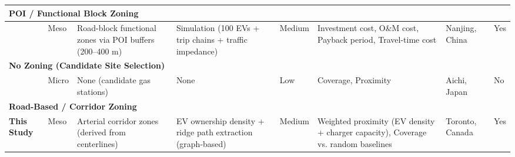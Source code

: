 \begin{table}[htbp]
{\begin{tabular}{p{1.2cm} p{2cm} p{2.4cm} p{2.6cm} >{\centering\arraybackslash}p{1.4cm} p{2.8cm} p{2cm} >{\centering\arraybackslash}p{1.4cm}}
\midrule
\multicolumn{8}{l}{\textbf{POI / Functional Block Zoning}} \\
\midrule
\cite{bian_planning_2022} & Meso & Road-block functional zones via POI buffers (200--400 m) & Simulation (100 EVs + trip chains + traffic impedance) & Medium & Investment cost, O\&M cost, Payback period, Travel-time cost & Nanjing, China & Yes \\
\midrule
\multicolumn{8}{l}{\textbf{No Zoning (Candidate Site Selection)}} \\
\midrule
\cite{ullah2023} & Micro & None (candidate gas stations) & None & Low & Coverage, Proximity & Aichi, Japan & No \\
\midrule
\multicolumn{8}{l}{\textbf{Road-Based / Corridor Zoning}} \\
\midrule
\textbf{This Study} & Meso & Arterial corridor zones (derived from centerlines) & EV ownership density + ridge path extraction (graph-based) & Medium & Weighted proximity (EV density + charger capacity), Coverage vs. random baselines & Toronto, Canada & Yes \\
\bottomrule
\end{tabular}}
\end{table}






